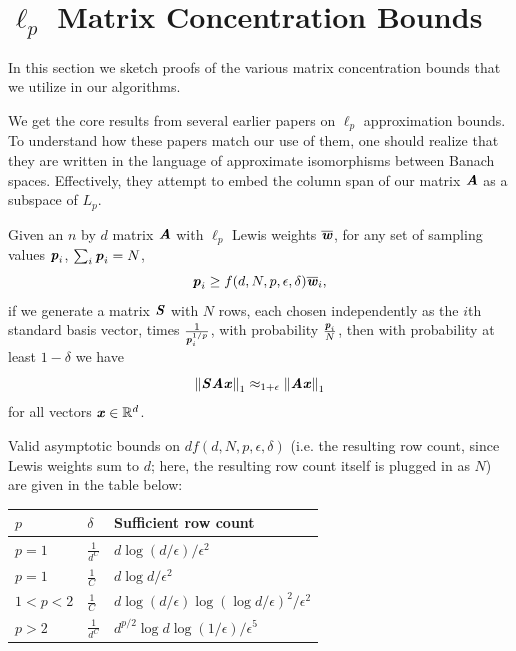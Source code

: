 
\section{$\ell_p$ Matrix Concentration Bounds}
\label{sec:ellp}

In this section we sketch proofs of the various matrix concentration
bounds that we utilize in our algorithms.

We get the core results from several earlier papers on $\ell_p$ approximation bounds.
To understand how these papers match our use of them, one should realize that they are
written in the language of approximate isomorphisms between Banach spaces.  Effectively,
they attempt to embed the column span of our matrix $\AA$ as a subspace of $L_p$.

\begin{theorem}
\label{thm:ellpsample}
Given an $n$ by $d$ matrix $\AA$
with $\ell_p$ Lewis weights $\wwbar$, for any set of sampling values $\pp_i$,
$\sum_i \pp_i = N$,
\begin{equation*}
\pp_i \geq f(d, N, p, \epsilon, \delta) \wwbar_i,
\end{equation*}
if we generate a matrix $\SS$ with $N$ rows, each chosen
independently as the $i$th standard basis vector,
times $\frac{1}{\pp_i^{1/p}}$, with probability $\frac{\pp_i}{N}$,
then with probability at least $1-\delta$ we have
\begin{equation*}
\norm{\SS \AA \xx}_1
\approx_{1 + \epsilon} \norm{\AA \xx}_1
\end{equation*}
for all vectors $\xx \in \Re^{d}$.

Valid asymptotic bounds on $d f(d, N, p, \epsilon, \delta)$ (i.e. the resulting row count,
since Lewis weights sum to $d$; here, the resulting row count itself
is plugged in as $N$) are given in the table below:

\begin{tabular}{| l | l | l |}
\hline
$p$ & $\delta$ & Sufficient row count \\ \hline
$p = 1$ & $\frac{1}{d^C}$ & $d \log(d / \epsilon) / \epsilon^2$ \\ \hline
$p = 1$ & $\frac{1}{C}$ & $d \log d / \epsilon^2$ \\ \hline
$1 < p < 2$ & $\frac{1}{C}$ & $d \log(d / \epsilon) \log(\log d / \epsilon)^2 / \epsilon^2$ \\ \hline
$p > 2$ & $\frac{1}{d^C}$ & $d^{p / 2} \log d \log(1 / \epsilon) / \epsilon^5$ \\ \hline
\end{tabular}
\end{theorem}

